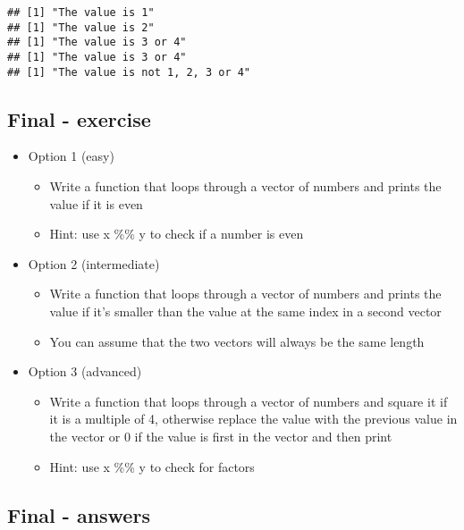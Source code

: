 \documentclass[]{article}
\providecommand{\tightlist}{%
  \setlength{\itemsep}{0pt}\setlength{\parskip}{0pt}}
\begin{document}
\begin{verbatim}
## [1] "The value is 1"
## [1] "The value is 2"
## [1] "The value is 3 or 4"
## [1] "The value is 3 or 4"
## [1] "The value is not 1, 2, 3 or 4"
\end{verbatim}

\subsection{Final - exercise}\label{final---exercise}

\begin{itemize}
\tightlist
\item
  Option 1 (easy)

  \begin{itemize}
  \tightlist
  \item
    Write a function that loops through a vector of numbers and prints
    the value if it is even
  \item
    Hint: use x \%\% y to check if a number is even
  \end{itemize}
\item
  Option 2 (intermediate)

  \begin{itemize}
  \tightlist
  \item
    Write a function that loops through a vector of numbers and prints
    the value if it's smaller than the value at the same index in a
    second vector
  \item
    You can assume that the two vectors will always be the same length
  \end{itemize}
\item
  Option 3 (advanced)

  \begin{itemize}
  \tightlist
  \item
    Write a function that loops through a vector of numbers and square
    it if it is a multiple of 4, otherwise replace the value with the
    previous value in the vector or 0 if the value is first in the
    vector and then print
  \item
    Hint: use x \%\% y to check for factors
  \end{itemize}
\end{itemize}

\subsection{Final - answers}\label{final---answers}
\end{document}
